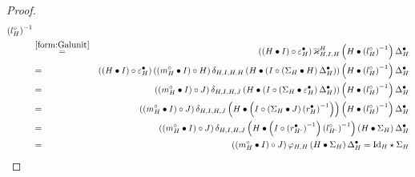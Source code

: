 \documentclass[nosumlimits,twoside]{amsart}
\theoremstyle{definition}
\theoremstyle{remark}
\def\revsn{\text{-}}
\begin{document}
\begin{proof}
\begin{eqnarray*}
{\left( l_{H}^{\circ }\right) ^{-1}} \\
&\overset{\eqref{form:Galunit}}{=}&\left( \left( H\bullet I\right) \circ
\varepsilon _{H}^{\bullet }\right) \overline{\varkappa }_{H,I,H}^{H}\left(
H\bullet \left( l_{H}^{\circ }\right) ^{-1}\right) \Delta _{H}^{\bullet } \\
&=&\left( \left( H\bullet I\right) \circ \varepsilon _{H}^{\bullet }\right)
\left( \left( m_{H}^{\circ }\bullet I\right) \circ H\right) \delta
_{H,I,H,H}\left( H\bullet \left( I\circ \left( \Sigma _{H}\bullet H\right)
\Delta _{H}^{\bullet }\right) \right) \left( H\bullet \left( l_{H}^{\circ
}\right) ^{-1}\right) \Delta _{H}^{\bullet } \\
&=&\left( \left( m_{H}^{\circ }\bullet I\right) \circ J\right) \delta
_{H,I,H,J}\left( H\bullet \left( I\circ \left( \Sigma _{H}\bullet
\varepsilon _{H}^{\bullet }\right) \Delta _{H}^{\bullet }\right) \right)
\left( H\bullet \left( l_{H}^{\circ }\right) ^{-1}\right) \Delta
_{H}^{\bullet } \\
&=&\left( \left( m_{H}^{\circ }\bullet I\right) \circ J\right) \delta
_{H,I,H,J}\left( H\bullet \left( I\circ \left( \Sigma _{H}\bullet J\right)
\left( r_{H}^{\bullet }\right) ^{-1}\right) \right) \left( H\bullet \left(
l_{H}^{\circ }\right) ^{-1}\right) \Delta _{H}^{\bullet } \\
&=&\left( \left( m_{H}^{\circ }\bullet I\right) \circ J\right) \delta
_{H,I,H,J}\left( H\bullet \left( I\circ \left( r_{H^{\revsn}}^{\bullet
}\right) ^{-1}\right) \left( l_{H^{\revsn}}^{\circ }\right) ^{-1}\right)
\left( H\bullet \Sigma _{H}\right) \Delta _{H}^{\bullet } \\
&=&\left( \left( m_{H}^{\circ }\bullet I\right) \circ J\right) \varphi
_{H,H}\left( H\bullet \Sigma _{H}\right) \Delta _{H}^{\bullet }=\mathrm{Id}%
_{H}\star \Sigma _{H}
\end{eqnarray*}


\end{proof}
\end{document}
